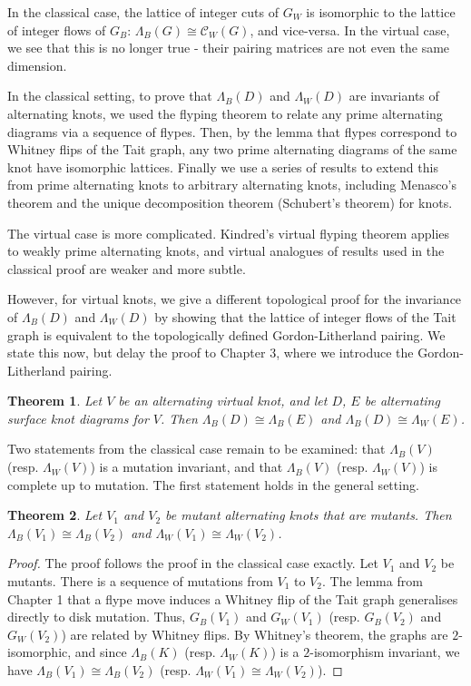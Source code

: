\documentclass[12pt]{report}
\newtheorem*{theorem}{Theorem}
\theoremstyle{upright}
\begin{document}
In the classical case, the lattice of integer cuts of $G_{W}$ is isomorphic to the lattice of integer flows of $G_{B}$: $\Lambda_{B}(G) \cong \mathcal{C}_{W}(G)$, and vice-versa. In the virtual case, we see that this is no longer true - their pairing matrices are not even the same dimension.

In the classical setting, to prove that $\Lambda_{B}(D)$ and $\Lambda_{W}(D)$ are invariants of alternating knots, we used the flyping theorem to relate any prime alternating diagrams via a sequence of flypes. Then, by the lemma that flypes correspond to Whitney flips of the Tait graph, any two prime alternating diagrams of the same knot have isomorphic lattices. Finally we use a series of results to extend this from prime alternating knots to arbitrary alternating knots, including Menasco's theorem and the unique decomposition theorem (Schubert's theorem) for knots.

The virtual case is more complicated. Kindred's virtual flyping theorem applies to weakly prime alternating knots, and virtual analogues of  results used in the classical proof are weaker and more subtle.

However, for virtual knots, we give a different topological proof for the invariance of $\Lambda_{B}(D)$ and $\Lambda_{W}(D)$ by showing that the lattice of integer flows of the Tait graph is equivalent to the topologically defined Gordon-Litherland pairing. We state this now, but delay the proof to Chapter 3, where we introduce the Gordon-Litherland pairing.

\begin{theorem}
Let $V$ be an alternating virtual knot, and let $D$, $E$ be alternating surface knot diagrams for $V$. Then $\Lambda_{B}(D) \cong \Lambda_{B}(E)$ and $\Lambda_{B}(D) \cong \Lambda_{W}(E)$.
\end{theorem}

Two statements from the classical case remain to be examined: that $\Lambda_{B}(V)$ (resp. $\Lambda_{W}(V)$) is a mutation invariant, and that $\Lambda_{B}(V)$ (resp. $\Lambda_{W}(V)$) is complete up to mutation. The first statement holds in the general setting.
\begin{theorem}
Let $V_{1}$ and $V_{2}$ be mutant alternating knots that are mutants. Then $\Lambda_{B}(V_{1}) \cong \Lambda_{B}(V_{2})$ and $\Lambda_{W}(V_{1}) \cong \Lambda_{W}(V_{2})$.
\end{theorem}
\begin{proof}
The proof follows the proof in the classical case exactly. Let $V_{1}$ and $V_{2}$ be mutants. There is a sequence of mutations from $V_{1}$ to $V_{2}$. The lemma from Chapter 1 that a flype move induces a Whitney flip of the Tait graph generalises directly to disk mutation. Thus, $G_{B}(V_{1})$ and $G_{W}(V_{1})$ (resp. $G_{B}(V_{2})$ and $G_{W}(V_{2})$) are related by Whitney flips. By Whitney's theorem, the graphs are $2$-isomorphic, and since $\Lambda_{B}(K)$ (resp. $\Lambda_{W}(K)$) is a $2$-isomorphism invariant, we have $\Lambda_{B}(V_{1}) \cong \Lambda_{B}(V_{2})$ (resp. $\Lambda_{W}(V_{1}) \cong \Lambda_{W}(V_{2})$).
\end{proof}
\end{document}
